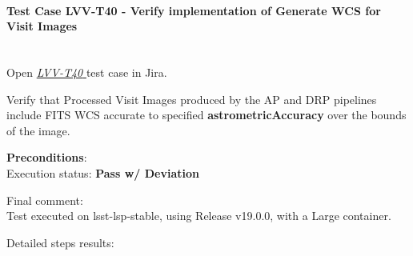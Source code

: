 \documentclass[DM,lsstdraft,STR,toc]{lsstdoc}
\begin{document}
\paragraph{Test Case LVV-T40 -  Verify implementation of Generate WCS for Visit Images
 }\mbox{}\\

Open  \href{https://jira.lsstcorp.org/secure/Tests.jspa#/testCase/LVV-T40}{\textit{ LVV-T40 } }
test case in Jira.

 Verify that Processed Visit Images produced by the AP and DRP pipelines
include FITS WCS accurate to specified \textbf{astrometricAccuracy} over
the bounds of the image.


\textbf{ Preconditions}:\\


Execution status: {\bf Pass w/ Deviation }

Final comment:\\ Test executed on lsst-lsp-stable, using Release v19.0.0, with a Large
container.



Detailed steps results:
\end{document}
